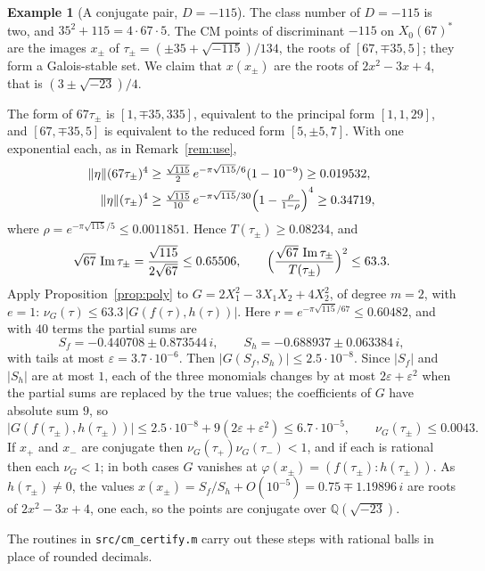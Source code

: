 \documentclass[11pt]{amsart}
\theoremstyle{definition}
\newtheorem{example}[theorem]{Example}
\theoremstyle{remark}
\newcommand{\Q}{\mathbb{Q}}
\newcommand{\im}{\operatorname{Im}}
\newcommand{\etanorm}[1]{\lVert\eta\rVert(#1)}
\begin{document}
\begin{example}[A conjugate pair, $D=-115$]\label{ex:115}
The class number of $D=-115$ is two, and $35^2+115=4\cdot67\cdot5$.  The CM
points of discriminant $-115$ on $X_0(67)^*$ are the images $x_\pm$ of
$\tau_\pm=(\pm35+\sqrt{-115})/134$, the roots of $[67,\mp35,5]$; they form a
Galois-stable set.  We claim that $x(x_\pm)$ are the roots of $2x^2-3x+4$,
that is $(3\pm\sqrt{-23})/4$.

The form of $67\tau_\pm$ is $[1,\mp35,335]$, equivalent to the principal form
$[1,1,29]$, and $[67,\mp35,5]$ is equivalent to the reduced form $[5,\pm5,7]$.
With one exponential each, as in Remark~\ref{rem:use},
\begin{align*}
\etanorm{67\tau_\pm}^4&\ge\tfrac{\sqrt{115}}2\,e^{-\pi\sqrt{115}/6}(1-10^{-9})\ge0.019532,\\
\etanorm{\tau_\pm}^4&\ge\tfrac{\sqrt{115}}{10}\,e^{-\pi\sqrt{115}/30}\Bigl(1-\tfrac{\rho}{1-\rho}\Bigr)^4\ge0.34719,
\end{align*}
where $\rho=e^{-\pi\sqrt{115}/5}\le0.0011851$.  Hence
$T(\tau_\pm)\ge0.08234$, and
\[
\sqrt{67}\,\im\tau_\pm=\frac{\sqrt{115}}{2\sqrt{67}}\le0.65506,
\qquad
\Bigl(\frac{\sqrt{67}\,\im\tau_\pm}{T(\tau_\pm)}\Bigr)^2\le63.3 .
\]
Apply Proposition~\ref{prop:poly} to $G=2X_1^2-3X_1X_2+4X_2^2$, of degree
$m=2$, with $e=1$: $\nu_G(\tau)\le63.3\,\lvert G(f(\tau),h(\tau))\rvert$.
Here $r=e^{-\pi\sqrt{115}/67}\le0.60482$, and with $40$ terms the partial sums
are
\[
S_f=-0.440708\pm0.873544\,i,\qquad S_h=-0.688937\pm0.063384\,i,
\]
with tails at most $\varepsilon=3.7\cdot10^{-6}$.  Then
$\lvert G(S_f,S_h)\rvert\le2.5\cdot10^{-8}$.  Since
$\lvert S_f\rvert$ and $\lvert S_h\rvert$ are at most $1$, each of the three monomials changes by
at most $2\varepsilon+\varepsilon^2$ when the partial sums are replaced by the
true values; the coefficients of $G$ have absolute sum $9$, so
\[
\lvert G(f(\tau_\pm),h(\tau_\pm))\rvert\le2.5\cdot10^{-8}+9(2\varepsilon+\varepsilon^2)\le6.7\cdot10^{-5},
\qquad\nu_G(\tau_\pm)\le0.0043 .
\]
If $x_+$ and $x_-$ are conjugate then $\nu_G(\tau_+)\nu_G(\tau_-)<1$, and if
each is rational then each $\nu_G<1$; in both cases $G$ vanishes at
$\varphi(x_\pm)=(f(\tau_\pm):h(\tau_\pm))$.  As $h(\tau_\pm)\ne0$, the values
$x(x_\pm)=S_f/S_h+O(10^{-5})=0.75\mp1.19896\,i$ are roots of $2x^2-3x+4$, one
each, so the points are conjugate over $\Q(\sqrt{-23})$.
\end{example}

The routines in \texttt{src/cm\_certify.m} carry out these steps with rational
balls in place of rounded decimals.
\end{document}
